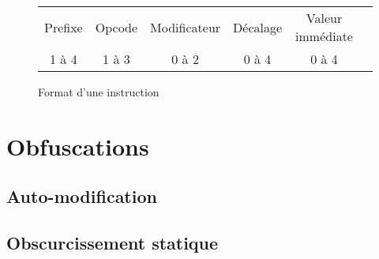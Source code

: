 \begin{figure}
\begin{center} 
\begin{tabular}{|c|c|c|c|c|c|}
\hline
Prefixe & Opcode & Modificateur & Décalage & Valeur immédiate\\
1 à 4 & 1 à 3 & 0 à 2 & 0 à 4 & 0 à 4\\
\hline
\end{tabular}
\end{center} 
\caption{Format d'une instruction \xq}
\label{fig:format_insts_x86}
\end{figure}

\section{Obfuscations}
\subsection{Auto-modification}

\subsection{Obscurcissement statique}
